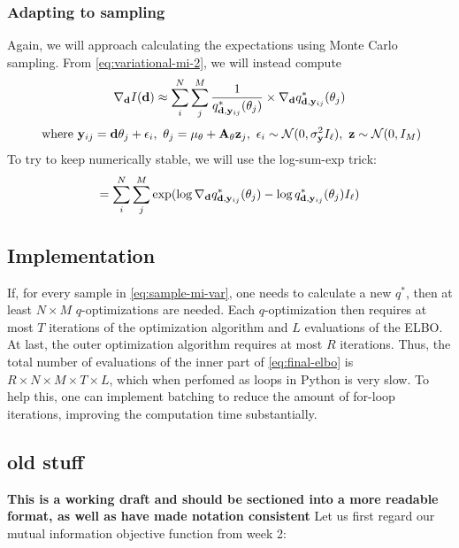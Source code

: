 \subsubsection{Adapting to sampling}
Again, we will approach calculating the expectations using Monte Carlo sampling. From \eqref{eq:variational-mi-2}, we will instead compute
\begin{equation}\nabla_{\mathbf{d}} I(\mathbf{d}) \approx \sum_{i}^N \sum_{j}^M \frac{1}{q^*_{\mathbf{d}, \mathbf{y}_{ij}}(\theta_{j})}\times \nabla_{\mathbf{d}}q^*_{\mathbf{d}, \mathbf{y}_{ij}}(\theta_{j})\end{equation}
$$\ \textrm{where}\ \B{y}_{ij} = \B{d}\theta_j + \epsilon_i,\ \theta_j = \mu_\theta + \B{A}_\theta\B{z}_j,\ \epsilon_i \sim \mathcal{N}(0, \sigma^2_\B{y} I_\ell),\ \B{z} \sim \mathcal{N}(0, I_M)$$
To try to keep numerically stable, we will use the log-sum-exp trick:
\begin{equation}= \sum_{i}^N \sum_{j}^M \exp (\log \nabla_{\mathbf{d}}q^*_{\mathbf{d}, \mathbf{y}_{ij}}(\theta_{j})- \log q^*_{\mathbf{d}, \mathbf{y}_{ij}}(\theta_{j})I_\ell) \label{eq:sample-mi-var}\end{equation}

\subsection{Implementation}
If, for every sample in \eqref{eq:sample-mi-var}, one needs to calculate a new $q^*$, then at least $N \times M$ $q$-optimizations are needed.
Each $q$-optimization then requires at most $T$ iterations of the optimization algorithm and $L$ evaluations of the ELBO. 
At last, the outer optimization algorithm requires at most $R$ iterations.
Thus, the total number of evaluations of the inner part of \eqref{eq:final-elbo} is $R \times N \times M \times T \times L$, 
which when perfomed as loops in Python is very slow. To help this, one can implement batching to reduce the amount of for-loop iterations, improving the computation time substantially.

\subsection{old stuff}

\textbf{This is a working draft and should be sectioned into a more readable format, as well as have made notation consistent}
Let us first regard our mutual information objective function from week 2:

